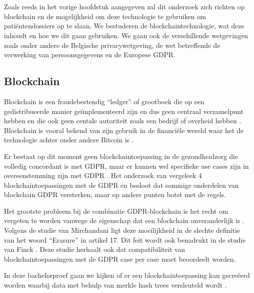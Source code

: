 \chapter{}
\label{ch:stand-van-zaken}

Zoals reeds in het vorige hoofdstuk aangegeven zal dit onderzoek zich richten op blockchain en de mogelijkheid om deze technologie te gebruiken om patiëntendossiers op te slaan. We bestuderen de blockchaintechnologie, wat deze inhoudt en hoe we dit gaan gebruiken. We gaan ook de verschillende wetgevingen zoals onder andere de Belgische privacywetgeving, de wet betreffende de verwerking van persoonsgegevens en de Europese GDPR.
\section{Blockchain}
\label{ch:blockchain}

Blockchain is een fraudebestendig ``ledger'' of grootboek die op een gedistribueerde manier geïmplementeerd zijn en dus geen centraal verzamelpunt hebben en die ook geen centale autoriteit zoals een bedrijf of overheid hebben \autocite{Yaga2018}. Blockchain is vooral bekend van zijn gebruik in de financiële wereld waar het de technologie achter onder andere Bitcoin is \autocite{Nofer2017}. 

Er bestaat op dit moment geen blockchaintoepassing in de gezondheidzorg die volledig concordant is met GDPR, maar er kunnen wel specifieke use cases zijn in overeenstemming zijn met GDPR \autocite{Hasselgren2020}. Het onderzoek van \textcite{Hasselgren2020} vergeleek 4 blockchaintoepassingen met de GDPR en besloot dat sommige onderdelen van blockchain GDPR versterken, maar op andere punten botst met de regels.

Het grootste probleem bij de combinatie GDPR-blockchain is het recht om vergeten te worden vanwege de eigenschap dat een blockchain onveranderlijk is \autocite{Pilkington2016}. Volgens de studie van Mirchandani \autocite{Mirchandani2019} ligt deze moeilijkheid in de slechte definitie van het woord ``Erasure'' in artikel 17. Dit feit wordt ook benadrukt in de studie van Finck \autocite{Finck2019}. Deze studie herhaalt ook dat compatibiliteit van blockchaintoepassingen met de GDPR case per case moet beoordeelt worden.

In deze bachelorproef gaan we kijken of er een blockchaintoepassing kan gecreëerd worden waarbij data met behulp van merkle hash trees versleuteld wordt \autocite{Niaz2015}.




